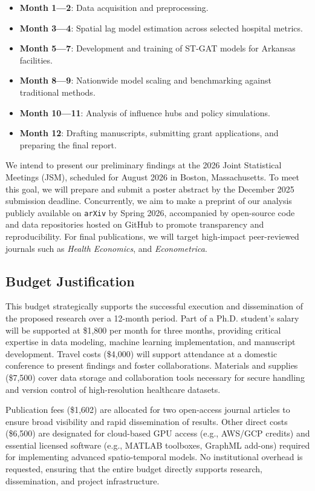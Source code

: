 \documentclass[10pt]{article}
\begin{document}
\begin{itemize}[itemsep=0pt, parsep=0pt]
\item \textbf{Month 1---2}: Data acquisition and preprocessing.
\item \textbf{Month 3---4}: Spatial lag model estimation across selected hospital metrics. 
\item \textbf{Month 5---7}: Development and training of ST-GAT models for Arkansas facilities. 
\item \textbf{Month 8---9}: Nationwide model scaling and benchmarking against traditional methods. 
\item \textbf{Month 10---11}: Analysis of influence hubs and policy simulations. 
\item \textbf{Month 12}: Drafting manuscripts, submitting grant applications, and preparing the final report.
\end{itemize}

We intend to present our preliminary findings at the 2026 Joint Statistical Meetings (JSM), scheduled for August 2026 in Boston, Massachusetts. To meet this goal, we will prepare and submit a poster abstract by the December 2025 submission deadline. Concurrently, we aim to make a preprint of our analysis publicly available on \texttt{arXiv} by Spring 2026, accompanied by open-source code and data repositories hosted on GitHub to promote transparency and reproducibility. For final publications, we will target high-impact peer-reviewed journals such as \textit{Health Economics}, and \textit{Econometrica}.

\subsection*{Budget Justification}

This budget strategically supports the successful execution and dissemination of the proposed research over a 12-month period. Part of a Ph.D. student's salary will be supported at \$1,800 per month for three months, providing critical expertise in data modeling, machine learning implementation, and manuscript development. Travel costs (\$4,000) will support attendance at a domestic conference to present findings and foster collaborations. Materials and supplies (\$7,500) cover data storage and collaboration tools necessary for secure handling and version control of high-resolution healthcare datasets.

Publication fees (\$1,602) are allocated for two open-access journal articles to ensure broad visibility and rapid dissemination of results. Other direct costs (\$6,500) are designated for cloud-based GPU access (e.g., AWS/GCP credits) and essential licensed software (e.g., MATLAB toolboxes, GraphML add-ons) required for implementing advanced spatio-temporal models. No institutional overhead is requested, ensuring that the entire budget directly supports research, dissemination, and project infrastructure.
\end{document}
